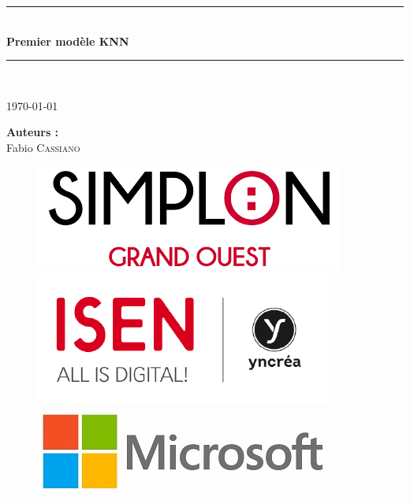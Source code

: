 \documentclass[french]{article}
\begin{document}
\begin{titlepage}

\newcommand{\HRule}{\rule{\linewidth}{0.5mm}} %

\center %
 
\HRule \\[0.4cm]
\vspace{1cm}
{ \huge \bfseries Premier modèle KNN}\\ %
\vspace{1cm}
\HRule \\[1cm]
 
\vspace{1cm}

\Large \today

\vspace{3cm}

\begin{minipage}{0.4\textwidth}
\begin{center}
\Large \textbf{Auteurs :}\\
\vspace{0.5cm}
Fabio \textsc{Cassiano}
\end{center}
\end{minipage}

\vspace{5cm}

\begin{figure}[!ht]
	\includegraphics[height=0.1\columnwidth]{images/logo/logo_simplon.png}
	\hspace*{0.5cm}
	\includegraphics[height=0.12\columnwidth]{images/logo/logo_Isen.png}
	\hspace*{0.5cm}
	\includegraphics[height=0.1\columnwidth]{images/logo/logo_microsoft.jpg}
\end{figure}

\vfill

\end{titlepage}
\end{document}
